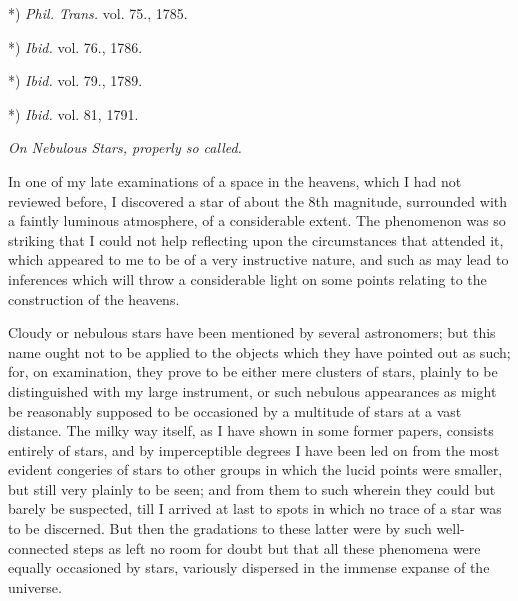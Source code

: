 \documentclass[a4paper, 12pt, oneside, polutonikogreek, english]{article}
\begin{document}
*) \emph{Phil. Trans.} vol. 75., 1785.

*) \emph{Ibid.} vol. 76., 1786.

*) \emph{Ibid.} vol. 79., 1789.

*) \emph{Ibid.} vol. 81, 1791.

\emph{On Nebulous Stars, properly so called.}

In one of my late examinations of a space in the heavens, which I had not reviewed before, I discovered a star of about the 8th magnitude, surrounded with a faintly luminous atmosphere, of a considerable extent. The phenomenon was so striking that I could not help reflecting upon the circumstances that attended it, which appeared to me to be of a very instructive nature, and such as may lead to inferences which will throw a considerable light on some points relating to the construction of the heavens.

Cloudy or nebulous stars have been mentioned by several astronomers; but this name ought not to be applied to the objects which they have pointed out as such; for, on examination, they prove to be either mere clusters of stars, plainly to be distinguished with my large instrument, or such nebulous appearances as might be reasonably supposed to be occasioned by a multitude of stars at a vast distance. The milky way itself, as I have shown in some former papers, consists entirely of stars, and by imperceptible degrees I have been led on from the most evident congeries of stars to other groups in which the lucid points were smaller, but still very plainly to be seen; and from them to such wherein they could but barely be suspected, till I arrived at last to spots in which no trace of a star was to be discerned. But then the gradations to these latter were by such well-connected steps as left no room for doubt but that all these phenomena were equally occasioned by stars, variously dispersed in the immense expanse of the universe.
\end{document}
